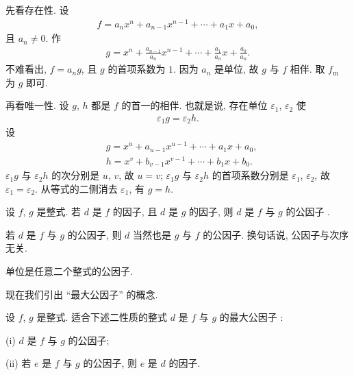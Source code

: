\begin{pf}
    先看存在性. 设
    \begin{align*}
        f = a_n x^n + a_{n-1} x^{n-1} + \cdots + a_1 x + a_0,
    \end{align*}
    且 $a_n \neq 0$. 作
    \begin{align*}
        g = x^n + \frac{a_{n-1}}{a_n} x^{n-1} + \cdots + \frac{a_1}{a_n} x + \frac{a_0}{a_n}.
    \end{align*}
    不难看出, $f = a_n g$, 且 $g$ 的首项系数为 $1$. 因为 $a_n$ 是单位, 故 $g$ 与 $f$ 相伴. 取 $f_\mathrm{m}$ 为 $g$ 即可.

    再看唯一性. 设 $g$, $h$ 都是 $f$ 的首一的相伴. 也就是说, 存在单位 $\varepsilon_1$, $\varepsilon_2$ 使
    \begin{align*}
        \varepsilon_1 g = \varepsilon_2 h.
    \end{align*}
    设
    \begin{align*}
         & g = x^u + a_{u-1} x^{u-1} + \cdots + a_1 x + a_0, \\
         & h = x^v + b_{v-1} x^{v-1} + \cdots + b_1 x + b_0.
    \end{align*}
    $\varepsilon_1 g$ 与 $\varepsilon_2 h$ 的次分别是 $u$, $v$, 故 $u = v$; $\varepsilon_1 g$ 与 $\varepsilon_2 h$ 的首项系数分别是 $\varepsilon_1$, $\varepsilon_2$, 故 $\varepsilon_1 = \varepsilon_2$. 从等式的二侧消去 $\varepsilon_1$, 有 $g = h$.
\end{pf}

\begin{definition}
    设 $f$, $g$ 是整式. 若 $d$ 是 $f$ 的因子, 且 $d$ 是 $g$ 的因子, 则 $d$ 是 $f$ 与 $g$ 的公因子 .
\end{definition}

\begin{remark}
    若 $d$ 是 $f$ 与 $g$ 的公因子, 则 $d$ 当然也是 $g$ 与 $f$ 的公因子. 换句话说, 公因子与次序无关.
\end{remark}

\begin{example}
    单位是任意二个整式的公因子.
\end{example}

现在我们引出 ``最大公因子'' 的概念.

\begin{definition}
    设 $f$, $g$ 是整式. 适合下述二性质的整式 $d$ 是 $f$ 与 $g$ 的最大公因子 :

    (i) $d$ 是 $f$ 与 $g$ 的公因子;

    (ii) 若 $e$ 是 $f$ 与 $g$ 的公因子, 则 $e$ 是 $d$ 的因子.
\end{definition}

